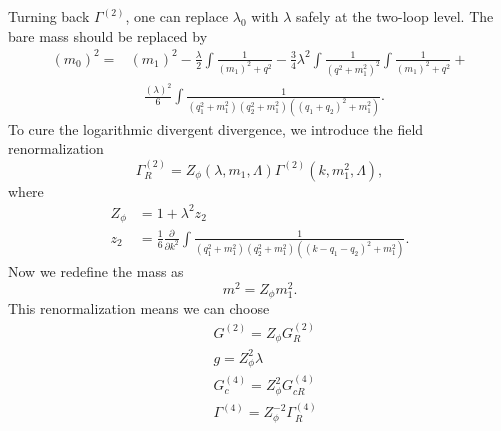 \documentclass[submission, PhysLectNotes]{SciPost}
\begin{document}
Turning back $\Gamma^{(2)}$, one can replace $\lambda_0$ with $\lambda$ safely at the two-loop level. The bare mass should be replaced by
\begin{equation}
	\begin{aligned}
		\left(m_0\right)^2 = & \left(m_1\right)^2 - \frac{\lambda}{2} \int \frac{1}{\left(m_1\right)^2+q^2} - \frac{3}{4} \lambda^2 \int \frac{1}{\left(q^2+m_1^2\right)^2}\int \frac{1}{\left(m_1\right)^2+q^2} + \\
		& \quad \frac{\left(\lambda\right)^2}{6} \int \frac{1}{\left(q_1^2+m_1^2\right)\left(q_2^2+m_1^2\right)\left(\left(q_1+q_2\right)^2+m_1^2\right)}.
	\end{aligned}
\end{equation} 
To cure the logarithmic divergent divergence, we introduce the field renormalization
\begin{equation}
	\Gamma_R^{(2)} = Z_\phi(\lambda,m_1,\Lambda) \Gamma^{(2)}(k,m_1^2,\Lambda),
\end{equation}
where 
\begin{equation}
	\begin{aligned}
		Z_\phi &= 1 + \lambda^2 z_2 \\
		z_2 &= \frac{1}{6}\frac{\partial}{\partial k^2} \int \frac{1}{\left(q_1^2+m_1^2\right)\left(q_2^2+m_1^2\right)\left(\left(k-q_1-q_2\right)^2+m_1^2\right)}.
	\end{aligned}
\end{equation}
Now we redefine the mass as 
\begin{equation}
	m^2 = Z_\phi m_1^2.
\end{equation}
This renormalization means we can choose
\begin{equation}
	\begin{aligned}
		&G^{(2)} = Z_\phi G^{(2)}_R \\
		&g = Z_\phi^2 \lambda \\
		&G_c^{(4)} = Z_\phi^2 G_{cR}^{(4)} \\
		&\Gamma^{(4)} = Z_\phi^{-2}\Gamma_R^{(4)}
	\end{aligned}
\end{equation}
\end{document}
